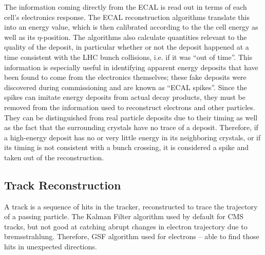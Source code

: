 The information coming directly from the ECAL 
is read out in terms of each cell's electronics response.  
The ECAL reconstruction algorithms translate this into 
an energy value, which is then calibrated 
according to the the cell energy as well as its 
$\eta$-position.  
The algorithms also calculate quantities 
relevant to the quality of the deposit, 
in particular whether or not the deposit happened 
at a time consistent with the LHC 
bunch collisions, i.e. if it was ``out of time''.  
This information is especially useful in 
identifying apparent energy deposits that have 
been found to come from the electronics themselves; 
these fake deposits were discovered during 
commissioning and are known as ``ECAL spikes''.  
Since the spikes can imitate energy deposits from 
actual decay products, 
they must be removed from the information used 
to reconstruct electrons and other particles.  
They can be distinguished from real particle deposits 
due to their timing 
as well as the fact that the surrounding crystals 
have no trace of a deposit.  
Therefore, if a high-energy deposit has no or 
very little energy in its neighboring crystals, 
or if its timing is not consistent with a bunch 
crossing, 
it is considered a spike and taken out of the 
reconstruction.  



\subsection{Track Reconstruction}
\label{evReco:track}
A track is a sequence of hits in the tracker, 
reconstructed to trace the trajectory of a passing 
particle.  
The Kalman Filter algorithm used by default for CMS tracks, 
but not good at catching abrupt changes in 
electron trajectory due to bremsstrahlung.  
Therefore, GSF algorithm used for electrons -- 
able to find those hits in unexpected directions.  

